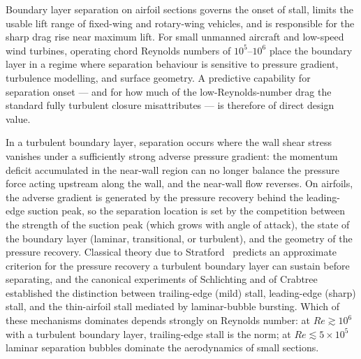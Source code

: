 \documentclass[11pt,a4paper]{article}
\begin{document}
Boundary layer separation on airfoil sections governs the onset of stall, limits the usable lift range of fixed-wing and rotary-wing vehicles, and is responsible for the sharp drag rise near maximum lift. For small unmanned aircraft and low-speed wind turbines, operating chord Reynolds numbers of $10^5$--$10^6$ place the boundary layer in a regime where separation behaviour is sensitive to pressure gradient, turbulence modelling, and surface geometry. A predictive capability for separation onset --- and for how much of the low-Reynolds-number drag the standard fully turbulent closure misattributes --- is therefore of direct design value.

In a turbulent boundary layer, separation occurs where the wall shear stress vanishes under a sufficiently strong adverse pressure gradient: the momentum deficit accumulated in the near-wall region can no longer balance the pressure force acting upstream along the wall, and the near-wall flow reverses. On airfoils, the adverse gradient is generated by the pressure recovery behind the leading-edge suction peak, so the separation location is set by the competition between the strength of the suction peak (which grows with angle of attack), the state of the boundary layer (laminar, transitional, or turbulent), and the geometry of the pressure recovery. Classical theory due to Stratford~\cite{stratford1959} predicts an approximate criterion for the pressure recovery a turbulent boundary layer can sustain before separating, and the canonical experiments of Schlichting and of Crabtree~\cite{schlichting1979,crabtree1957} established the distinction between trailing-edge (mild) stall, leading-edge (sharp) stall, and the thin-airfoil stall mediated by laminar-bubble bursting. Which of these mechanisms dominates depends strongly on Reynolds number: at $Re \gtrsim 10^6$ with a turbulent boundary layer, trailing-edge stall is the norm; at $Re \lesssim 5\times10^5$ laminar separation bubbles dominate the aerodynamics of small sections.
\end{document}
